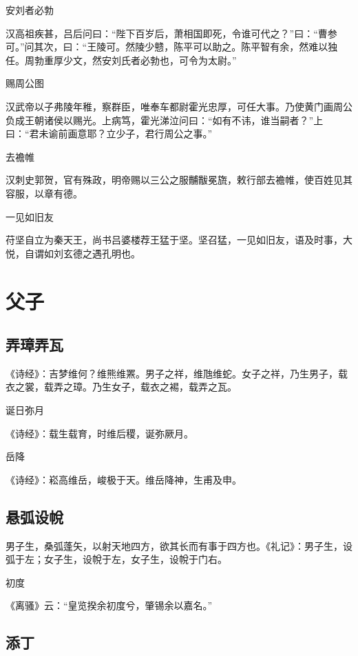 \documentclass[a4paper,12pt,UTF8,twoside]{ctexbook}
\begin{document}
    安刘者必勃
    
    汉高祖疾甚，吕后问曰：“陛下百岁后，萧相国即死，令谁可代之？”曰：“曹参可。”问其次，曰：“王陵可。然陵少戆，陈平可以助之。陈平智有余，然难以独任。周勃重厚少文，然安刘氏者必勃也，可令为太尉。”
    
    赐周公图
    
    汉武帝以子弗陵年稚，察群臣，唯奉车都尉霍光忠厚，可任大事。乃使黄门画周公负成王朝诸侯以赐光。上病笃，霍光涕泣问曰：“如有不讳，谁当嗣者？”上曰：“君未谕前画意耶？立少子，君行周公之事。”
    
    去襜帷
    
    汉刺史郭贺，官有殊政，明帝赐以三公之服黼黻冕旒，敕行部去襜帷，使百姓见其容服，以章有德。
    
    一见如旧友
    
    苻坚自立为秦天王，尚书吕婆楼荐王猛于坚。坚召猛，一见如旧友，语及时事，大悦，自谓如刘玄德之遇孔明也。
    
    \chapter{父子}
    
    \section{弄璋弄瓦}
    
    《诗经》：吉梦维何？维熊维罴。男子之祥，维虺维蛇。女子之祥，乃生男子，载衣之裳，载弄之璋。乃生女子，载衣之裼，载弄之瓦。
    
    诞日弥月
    
    《诗经》：载生载育，时维后稷，诞弥厥月。
    
    岳降
    
    《诗经》：崧高维岳，峻极于天。维岳降神，生甫及申。
    
    \section{悬弧设帨}
    
    男子生，桑弧蓬矢，以射天地四方，欲其长而有事于四方也。《礼记》：男子生，设弧于左；女子生，设帨于左，女子生，设帨于门右。
    
    初度
    
    《离骚》云：“皇览揆余初度兮，肇锡余以嘉名。”
    
    \section{添丁}
    
\end{document}
